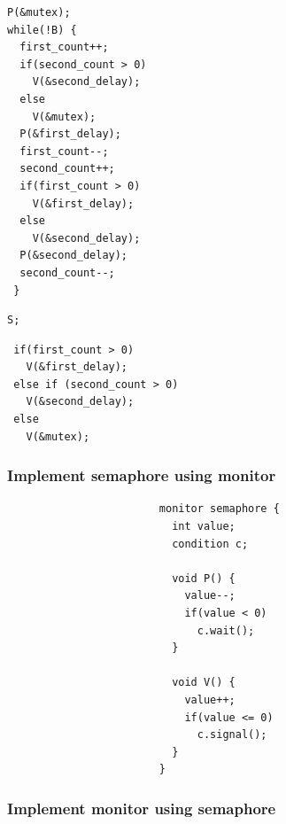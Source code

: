 \documentclass[CJKutf8,xcolor=pdftex,dvipsnames,table]{beamer}
\begin{document}
\begin{CJK*}{UTF8}{song}
\begin{frame}[fragile]
\begin{minipage}[c]{0.4\textwidth}
\begin{lstlisting}
P(&mutex);
while(!B) {
  first_count++;
  if(second_count > 0)
    V(&second_delay);
  else
    V(&mutex);
  P(&first_delay);
  first_count--;
  second_count++;
  if(first_count > 0)
    V(&first_delay);
  else
    V(&second_delay);
  P(&second_delay);
  second_count--;
 }
\end{lstlisting} \pause

  \end{minipage}%
  \begin{minipage}[c]{0.2\textwidth}

\begin{lstlisting}
S;
\end{lstlisting}

    \pause
  \end{minipage}%
  \begin{minipage}[c]{0.4\textwidth}

\begin{lstlisting}
 if(first_count > 0)
   V(&first_delay);
 else if (second_count > 0)
   V(&second_delay);
 else
   V(&mutex);
\end{lstlisting}

  \end{minipage}
\end{frame}

\fi

  \begin{frame}[fragile]
  \frametitle{Implement semaphore using monitor} \pause

\begin{lstlisting}
                        monitor semaphore {
                          int value;
                          condition c;

                          void P() {
                            value--;
                            if(value < 0)
                              c.wait();
                          }

                          void V() {
                            value++;
                            if(value <= 0)
                              c.signal();
                          }
                        }
\end{lstlisting}

\end{frame}

  \begin{frame}[fragile]
  \frametitle{Implement monitor using semaphore} \pause


\end{frame}
\end{CJK*}
\end{document}
